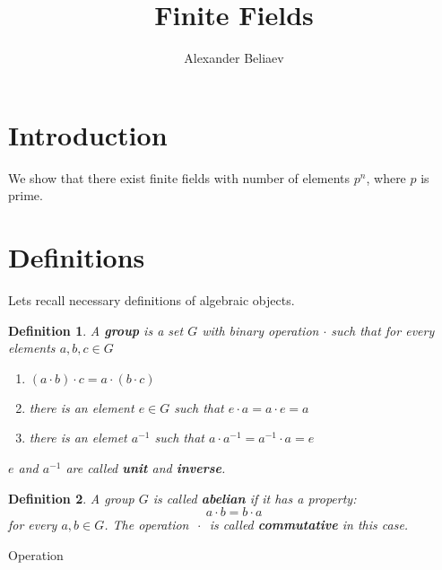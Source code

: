 \documentclass[a4paper, 12pt]{article}
\title{Finite Fields}
\author{Alexander Beliaev}
\newtheorem{definition}{Definition}
\begin{document}
\maketitle

\section{Introduction}
We show that there exist finite fields with number of elements $p^n$, where $p$ is prime.

\section{Definitions}
Lets recall necessary definitions of algebraic objects.

\begin{definition}
A \textbf{group} is a set $G$ with binary operation $\cdot$ such that
for every elements $a, b, c\in G$
\begin{enumerate}
    \item $(a\cdot b) \cdot c = a\cdot (b\cdot c)$
    \item there is an element $e\in G$ such that $e\cdot a = a\cdot e = a$
    \item there is an elemet $a^{-1}$ such that $a\cdot a^{-1}=a^{-1}\cdot a = e$
\end{enumerate}
$e$ and $a^{-1}$ are called \textbf{unit} and \textbf{inverse}.
\end{definition} 

\begin{definition}
A group $G$ is called \textbf{abelian} if it has a property:
$$
a\cdot b=b\cdot a
$$
for every $a, b\in G$. The operation $\,\cdot\, $ is called \textbf{commutative}
in this case. 
\end{definition}

Operation 
\end{document}
